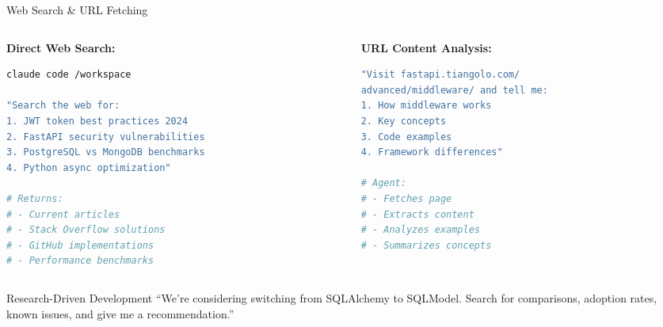 \documentclass[aspectratio=169,11pt]{beamer}
\begin{document}
\begin{frame}[fragile]{Web Search \& URL Fetching}
    \begin{columns}[T]
        \begin{column}{0.48\textwidth}
            \textbf{Direct Web Search:}
            \begin{lstlisting}[language=bash, basicstyle=\ttfamily\tiny]
claude code /workspace

"Search the web for:
1. JWT token best practices 2024
2. FastAPI security vulnerabilities
3. PostgreSQL vs MongoDB benchmarks
4. Python async optimization"

# Returns:
# - Current articles
# - Stack Overflow solutions
# - GitHub implementations
# - Performance benchmarks
            \end{lstlisting}
        \end{column}
        \begin{column}{0.48\textwidth}
            \textbf{URL Content Analysis:}
            \begin{lstlisting}[language=bash, basicstyle=\ttfamily\tiny]
"Visit fastapi.tiangolo.com/
advanced/middleware/ and tell me:
1. How middleware works
2. Key concepts
3. Code examples
4. Framework differences"

# Agent:
# - Fetches page
# - Extracts content
# - Analyzes examples
# - Summarizes concepts
            \end{lstlisting}
        \end{column}
    \end{columns}

    \vspace{0.3cm}
    \begin{block}{Research-Driven Development}
        ``We're considering switching from SQLAlchemy to SQLModel. Search for comparisons, adoption rates, known issues, and give me a recommendation.''
    \end{block}

\end{frame}
\end{document}
